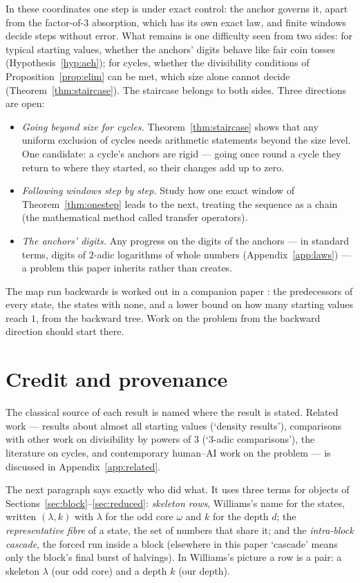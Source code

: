 \documentclass[11pt]{article}
\theoremstyle{remark}
\newcommand{\w}{\omega}
\begin{document}
In these coordinates one step is under exact control: the anchor governs it, apart from the factor-of-$3$ absorption, which has its own exact law, and finite windows decide steps without error. What remains is one difficulty seen from two sides: for typical starting values, whether the anchors' digits behave like fair coin tosses (Hypothesis~\ref{hyp:aeh}); for cycles, whether the divisibility conditions of Proposition~\ref{prop:elim} can be met, which size alone cannot decide (Theorem~\ref{thm:staircase}). The staircase belongs to both sides. Three directions are open:
\begin{itemize}
\item \emph{Going beyond size for cycles.} Theorem~\ref{thm:staircase} shows that any uniform exclusion of cycles needs arithmetic statements beyond the size level. One candidate: a cycle's anchors are rigid --- going once round a cycle they return to where they started, so their changes add up to zero.
\item \emph{Following windows step by step.} Study how one exact window of Theorem~\ref{thm:onestep} leads to the next, treating the sequence as a chain (the mathematical method called transfer operators).
\item \emph{The anchors' digits.} Any progress on the digits of the anchors --- in standard terms, digits of $2$-adic logarithms of whole numbers (Appendix~\ref{app:laws}) --- a problem this paper inherits rather than creates.
\end{itemize}

The map run backwards is worked out in a companion paper \cite{mirror}: the predecessors of every state, the states with none, and a lower bound on how many starting values reach $1$, from the backward tree. Work on the problem from the backward direction should start there.

\section{Credit and provenance}\label{sec:credit}

The classical source of each result is named where the result is stated. Related work --- results about almost all starting values (`density results'), comparisons with other work on divisibility by powers of $3$ (`$3$-adic comparisons'), the literature on cycles, and contemporary human--AI work on the problem --- is discussed in Appendix~\ref{app:related}.

The next paragraph says exactly who did what. It uses three terms for objects of Sections~\ref{sec:block}--\ref{sec:reduced}: \emph{skeleton rows}, Williams's name for the states, written $(\lambda,k)$ with $\lambda$ for the odd core $\w$ and $k$ for the depth $d$; the \emph{representative fibre} of a state, the set of numbers that share it; and the \emph{intra-block cascade}, the forced run inside a block (elsewhere in this paper `cascade' means only the block's final burst of halvings). In Williams's picture a row is a pair: a skeleton $\lambda$ (our odd core) and a depth $k$ (our depth).
\end{document}
